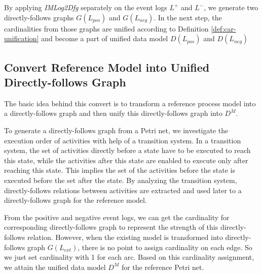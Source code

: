 By applying \emph{IMLog2Dfg} separately on the event logs $L^+$ and $L^-$, we generate two directly-follows graphs $G(L_{pos})$ and $G(L_{neg})$.  In the next step, the cardinalities from those graphs are unified according to Definition \ref{def:car-unification} and become a part of unified data model $D(L_{pos})$ and $D(L_{neg})$

\subsection{Convert Reference Model into Unified Directly-follows Graph}
The basic idea behind this convert is to transform a reference process model into a directly-follows graph and then unify this directly-follows graph into $D^M$.


To generate a directly-follows graph from a Petri net, we investigate the execution order of activities with help of a transition system. %
In a transition system, the set of activities directly before a state have to be executed to reach this state, while the activities after this state are enabled to execute only after reaching this state. This implies the set of the activities before the state is executed before the set after the state. By analyzing the transition system, directly-follows relations between activities are extracted and used later to a directly-follows graph for the reference model.

From the positive and negative event logs, we can get the cardinality for corresponding directly-follows graph to represent the strength of this directly-follows relation. However, when the existing model is transformed into  directly-follows graph $G(L_{ext})$, there is no point to assign cardinality on each edge. So we just set cardinality with 1 for each arc. Based on this cardinality assignment, we attain the unified data model $D^M$ for the reference Petri net.

